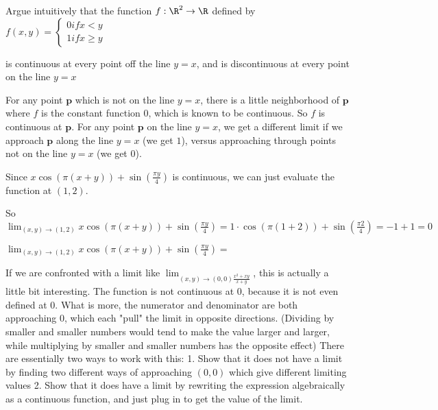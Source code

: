 \documentclass{ximera}
\begin{document}
		Argue intuitively that the function $f:\R^2 \to \R$ defined by 
			$f(x,y) = \begin{cases}
			0 if x<y\\
			1 if x\geq y
			\end{cases}$
			
			is continuous at every point off the line $y=x$, and is discontinuous at every point on the line $y=x$
\begin{free-response}
	For any point $\mathbf{p}$ which is not on the line $y=x$, there is a little neighborhood of $\mathbf{p}$ where $f$ is the constant function $0$,
	 which is known to be  continuous.  So $f$ is continuous at $\mathbf{p}$.  For any point $\mathbf{p}$ on the line $y=x$, we get a different limit if we approach 
	 $\mathbf{p}$ along the line $y=x$ (we get $1$), versus approaching through points not on the line $y=x$ (we get $0$).
\end{free-response}
	
	\begin{question}
		\begin{solution}
		\begin{hint}
			Since $x\cos(\pi (x+y)) + \sin(\frac{\pi y}{4})$ is continuous, we can just evaluate the function at $(1,2)$.
		\end{hint}
		\begin{hint}
			So $\lim_{(x,y) \to (1,2)} x\cos(\pi (x+y)) + \sin(\frac{\pi y}{4}) = 1 \cdot \cos(\pi(1+2))+\sin(\frac{\pi 2}{4}) = -1+1=0$
		\end{hint}
		$\lim_{(x,y) \to (1,2)} x\cos(\pi (x+y)) + \sin(\frac{\pi y}{4}) =$ 
		\end{solution}
	\end{question}
	
	If we are confronted with a limit like $\lim_{(x,y) \to (0,0) \frac{x^2+xy}{x+y}}$, this is actually a little bit interesting.  The function is not continuous at $0$, because it is
	not even defined at $0$.  What is more, the numerator and denominator are both approaching $0$, which each "pull" the limit in opposite directions. 
	(Dividing by smaller and smaller numbers would tend to make the value larger and larger, while multiplying by smaller and smaller numbers has the opposite effect)
	  There are essentially two ways to work with this: 
	1. Show that it does not have a limit by finding two different ways of approaching $(0,0)$ which give different limiting values
	2. Show that it does have a limit by rewriting the expression algebraically as a continuous function, and just plug in to get the value of the limit.
	
\end{document}
